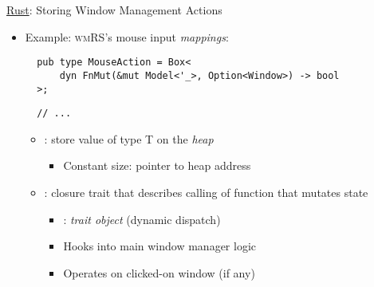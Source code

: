\begin{frame}[fragile]{\underline{Rust}: Storing Window Management Actions \hfill {\footnotesize \currentname}}


    \begin{itemize}

        \item Example: \textsc{wmRS}'s mouse input \textit{mappings}:\\[3pt]
\begin{verbatim}
  pub type MouseAction = Box<
      dyn FnMut(&mut Model<'_>, Option<Window>) -> bool
  >;
\end{verbatim}
\begin{verbatim}
  // ...
\end{verbatim}

    \vspace*{5pt}\begin{itemize}

        \item {}: store value of type T on the \textit{heap}
            \begin{itemize}
                \item Constant size: pointer to heap address
            \end{itemize}

        \item {}: closure trait that describes calling of function that mutates state
            \begin{itemize}
                \item {}: \textit{trait object} (dynamic dispatch)
                \item Hooks into main window manager logic
                \item Operates on clicked-on window (if any)
            \end{itemize}

    \end{itemize}

    \end{itemize}

    \vfill

\end{frame}

